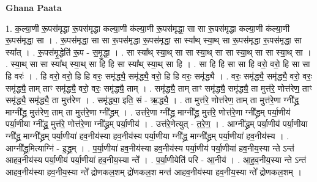 \documentclass[17pt]{extarticle}
\begin{document}
\textbf{Ghana Paata } \newline

1. क॒ल्या॒णी रू॒पस॑मृद्धा रू॒पस॑मृद्धा कल्या॒णी क॑ल्या॒णी रू॒पस॑मृद्धा॒ सा सा रू॒पस॑मृद्धा कल्या॒णी क॑ल्या॒णी रू॒पस॑मृद्धा॒ सा । . रू॒पस॑मृद्धा॒ सा सा रू॒पस॑मृद्धा रू॒पस॑मृद्धा॒ सा स्या᳚थ् स्या॒थ् सा रू॒पस॑मृद्धा रू॒पस॑मृद्धा॒ सा स्या᳚त् । . रू॒पस॑मृ॒द्धेति॑ रू॒प - स॒मृ॒द्धा॒ । . सा स्या᳚थ् स्या॒थ् सा सा स्या॒थ् सा सा स्या॒थ् सा सा स्या॒थ् सा । . स्या॒थ् सा सा स्या᳚थ् स्या॒थ् सा हि हि सा स्या᳚थ् स्या॒थ् सा हि । . सा हि हि सा सा हि वरो॒ वरो॒ हि सा सा हि वरः॑ । . हि वरो॒ वरो॒ हि हि वरः॒ समृ॑द्ध्यै॒ समृ॑द्ध्यै॒ वरो॒ हि हि वरः॒ समृ॑द्ध्यै । . वरः॒ समृ॑द्ध्यै॒ समृ॑द्ध्यै॒ वरो॒ वरः॒ समृ॑द्ध्यै॒ ताम् ताꣳ समृ॑द्ध्यै॒ वरो॒ वरः॒ समृ॑द्ध्यै॒ ताम् । . समृ॑द्ध्यै॒ ताम् ताꣳ समृ॑द्ध्यै॒ समृ॑द्ध्यै॒ ता मुत्त॑रे॒ णोत्त॑रेण॒ ताꣳ समृ॑द्ध्यै॒ समृ॑द्ध्यै॒ ता मुत्त॑रेण । . समृ॑द्ध्या॒ इति॒ सं - ऋ॒द्ध्यै॒ । . ता मुत्त॑रे॒ णोत्त॑रेण॒ ताम् ता मुत्त॑रे॒णा ग्नी᳚द्ध्र॒ माग्नी᳚द्ध्र॒ मुत्त॑रेण॒ ताम् ता मुत्त॑रे॒णा ग्नी᳚द्ध्रम् । . उत्त॑रे॒णा ग्नी᳚द्ध्र॒ माग्नी᳚द्ध्र॒ मुत्त॑रे॒ णोत्त॑रे॒णा ग्नी᳚द्ध्रम् पर्या॒णीय॑ पर्या॒णीया ग्नी᳚द्ध्र॒ मुत्त॑रे॒
णोत्त॑रे॒णा ग्नी᳚द्ध्रम् पर्या॒णीय॑ । . उत्त॑रे॒णेत्युत् - त॒रे॒ण॒ । . आग्नी᳚द्ध्रम् पर्या॒णीय॑ पर्या॒णीया ग्नी᳚द्ध्र॒ माग्नी᳚द्ध्रम् पर्या॒णीया॑ हव॒नीय॑स्या हव॒नीय॑स्य पर्या॒णीया ग्नी᳚द्ध्र॒ माग्नी᳚द्ध्रम् पर्या॒णीया॑ हव॒नीय॑स्य । . आग्नी᳚द्ध्र॒मित्याग्नि॑ - इ॒द्ध्र॒म् । . प॒र्या॒णीया॑ हव॒नीय॑स्या हव॒नीय॑स्य पर्या॒णीय॑ पर्या॒णीया॑ हव॒नीय॒स्या न्ते ऽन्त॑ आहव॒नीय॑स्य पर्या॒णीय॑ पर्या॒णीया॑ हव॒नीय॒स्या न्ते᳚ । . प॒र्या॒णीयेति॑ परि - आ॒नीय॑ । . आ॒ह॒व॒नीय॒स्या न्ते ऽन्त॑ आहव॒नीय॑स्या हव॒नीय॒स्या न्ते᳚ द्रोणकल॒शम् द्रो॑णकल॒श मन्त॑ आहव॒नीय॑स्या हव॒नीय॒स्या न्ते᳚ द्रोणकल॒शम् । \newline
\end{document}

